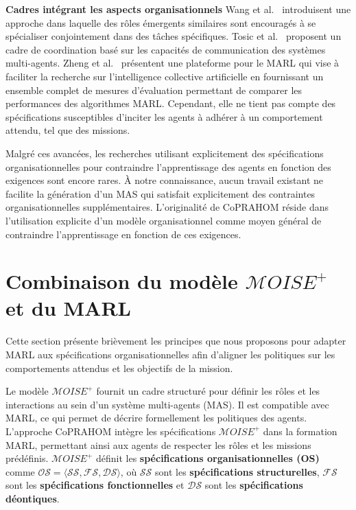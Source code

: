 \textbf{Cadres intégrant les aspects organisationnels} \quad
Wang et al.~\cite{Wang2020} introduisent une approche dans laquelle des rôles émergents similaires sont encouragés à se spécialiser conjointement dans des tâches spécifiques. Tosic et al.~\cite{Tosic2010} proposent un cadre de coordination basé sur les capacités de communication des systèmes multi-agents. Zheng et al.~\cite{Zheng2018} présentent une plateforme pour le MARL qui vise à faciliter la recherche sur l'intelligence collective artificielle en fournissant un ensemble complet de mesures d'évaluation permettant de comparer les performances des algorithmes MARL. Cependant, elle ne tient pas compte des spécifications susceptibles d'inciter les agents à adhérer à un comportement attendu, tel que des missions.


Malgré ces avancées, les recherches utilisant explicitement des spécifications organisationnelles pour contraindre l'apprentissage des agents en fonction des exigences sont encore rares. À notre connaissance, aucun travail existant ne facilite la génération d'un MAS qui satisfait explicitement des contraintes organisationnelles supplémentaires. L'originalité de CoPRAHOM réside dans l'utilisation explicite d'un modèle organisationnel comme moyen général de contraindre l'apprentissage en fonction de ces exigences.

\section{Combinaison du modèle $\mathcal{M}OISE^+$ et du MARL}
\label{sec:marl_moise_linking}

Cette section présente brièvement les principes que nous proposons pour adapter MARL aux spécifications organisationnelles afin d'aligner les politiques sur les comportements attendus et les objectifs de la mission.

Le modèle $\mathcal{M}OISE^+$ fournit un cadre structuré pour définir les rôles et les interactions au sein d'un système multi-agents (MAS). Il est compatible avec MARL, ce qui permet de décrire formellement les politiques des agents. L'approche CoPRAHOM intègre les spécifications $\mathcal{M}OISE^+$ dans la formation MARL, permettant ainsi aux agents de respecter les rôles et les missions prédéfinis. $\mathcal{M}OISE^+$ définit les \textbf{spécifications organisationnelles (OS)} comme $\mathcal{OS} = \langle \mathcal{SS}, \mathcal{FS}, \mathcal{DS} \rangle$, où $\mathcal{SS}$ sont les \textbf{spécifications structurelles}, $\mathcal{FS}$ sont les \textbf{spécifications fonctionnelles} et $\mathcal{DS}$ sont les \textbf{spécifications déontiques}.

